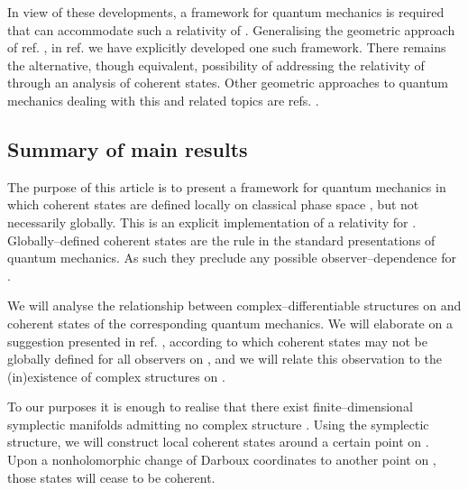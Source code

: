\documentclass[a4paper,a4paper]{article}
\begin{document}
In view of these developments, a framework for quantum mechanics 
is required that can accommodate such a relativity of \myHighlight{$\hbar$}\coordHE{} \cite{VAFA}.
Generalising the geometric approach of ref. \cite{ASHTEKAR}, 
in ref. \cite{ME} we have explicitly developed one such framework. 
There remains the alternative, though equivalent, possibility of addressing 
the relativity of \myHighlight{$\hbar$}\coordHE{} through an analysis of coherent states.
Other geometric approaches to quantum mechanics dealing with this and 
related topics are refs. 
\cite{ANANDAN, MATONE, FH, GEOMKLAUDER, MILANO, TIWARI, MEX}.

\subsection{Summary of main results}\label{suma}

The purpose of this article is to present a framework for quantum mechanics in which
coherent states are defined locally on classical phase space \coordHE{}, 
but not necessarily globally. This is an explicit implementation of a relativity for \myHighlight{$\hbar$}\coordHE{}.
Globally--defined coherent states are the rule in the standard 
presentations of quantum mechanics. As such they preclude any possible 
observer--dependence for \myHighlight{$\hbar$}\coordHE{}.

We will analyse the relationship between complex--differentiable structures
on \coordHE{} and coherent states of the corresponding quantum mechanics. 
We will elaborate on a suggestion presented in ref. \cite{ME}, according to which coherent 
states may not be globally defined for all observers on \coordHE{}, 
and we will relate this observation to the (in)existence of complex structures on \coordHE{}. 

To our purposes it is enough to realise that there exist finite--dimensional symplectic 
manifolds \coordHE{} admitting no complex structure \cite{MCDUFF}. 
Using the symplectic structure, we will construct local coherent states around a certain point 
on \coordHE{}. Upon a nonholomorphic change of Darboux coordinates to another point on 
\coordHE{}, those states will cease to be coherent. 
\end{document}
